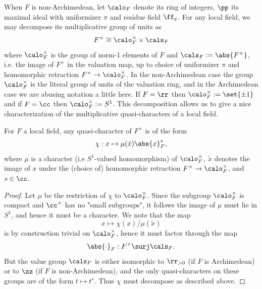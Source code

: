 \documentclass[11pt, x11names, openany]{book}
\begin{document}
When $F$ is non-Archimedean, let $\calo_F$ denote its ring of integers, $\pp$ its maximal ideal with uniformizer $\pi$ and residue field $\ff_q$. For any local field, we may decompose its multiplicative group of units as
\begin{equation*}
    F^\times \cong \calo_F^\times \times \cals_F
\end{equation*}
where $\calo_F^\times$ is the group of norm-1 elements of $F$ and $\cals_F := \abs{F^\times}$, i.e. the image of $F^\times$ in the valuation map, up to choice of uniformizer $\pi$ and homomorphic retraction $F^\times \to \calo_F^\times$. In the non-Archimedean case the group $\calo_F^\times$ is the literal group of units of the valuation ring, and in the Archimedean case we are abusing notation a little here. If $F = \rr$ then $\calo_F^\times := \set{\pm 1}$ and if $F = \cc$ then $\calo_F^\times := S^1$. This decomposition allows us to give a nice characterization of the multiplicative quasi-characters of a local field.

\begin{proposition}
    \label{prop: quasi-char of local field}
    For $F$ a local field, any quasi-character of $F^\times$ is of the form
    \begin{equation*}
        \chi: x \mapsto \mu(\tilde{x}) \abs{x}_F^s,
    \end{equation*}
    where $\mu$ is a character (i.e $S^1$-valued homomorphism) of $\calo_F^\times$, $\tilde{x}$ denotes the image of $x$ under the (choice of) homomorphic retraction $F^\times \to \calo_F^\times$, and $s \in \cc$.
\end{proposition}
\begin{proof}
Let $\mu$ be the restriction of $\chi$ to $\calo_F^\times$. Since the subgroup $\calo_F^\times$ is compact and $\cc^\times$ has no "small subgroups", it follows the image of $\mu$ must lie in $S^1$, and hence it must be a character. We note that the map
\begin{equation*}
    x \mapsto \chi(x)/\mu(\tilde{x})
\end{equation*}
is by construction trivial on $\calo_F^\times$, hence it must factor through the map
\begin{equation*}
    \abs{\cdot}_F : F^\times \surj \cals_F.
\end{equation*}
But the value group $\cals_F$ is either isomorphic to $\rr_{> 0}$ (if $F$ is Archimedean) or to $\zz$ (if $F$ is non-Archimedean), and the only quasi-characters on these groups are of the form $t \mapsto t^s$. Thus $\chi$ must decompose as described above.
\end{proof}
\end{document}
